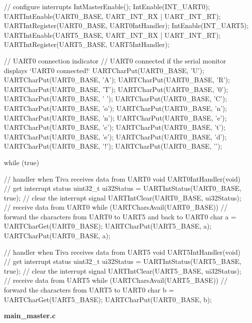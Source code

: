 \documentclass[12pt, a4paper]{article}
\begin{document}
\begin{code}
{    // configure interrupts
    IntMasterEnable();
    IntEnable(INT_UART0);
    UARTIntEnable(UART0_BASE, UART_INT_RX | UART_INT_RT);
    UARTIntRegister(UART0_BASE, UART0IntHandler);
    IntEnable(INT_UART5);
    UARTIntEnable(UART5_BASE, UART_INT_RX | UART_INT_RT);
    UARTIntRegister(UART5_BASE, UART5IntHandler);

    // UART0 connection indicator
    // UART0 connected if the serial monitor displays `UART0 connected!`
    UARTCharPut(UART0_BASE, 'U');
    UARTCharPut(UART0_BASE, 'A');
    UARTCharPut(UART0_BASE, 'R');
    UARTCharPut(UART0_BASE, 'T');
    UARTCharPut(UART0_BASE, '0');
    UARTCharPut(UART0_BASE, ' ');
    UARTCharPut(UART0_BASE, 'C');
    UARTCharPut(UART0_BASE, 'o');
    UARTCharPut(UART0_BASE, 'n');
    UARTCharPut(UART0_BASE, 'n');
    UARTCharPut(UART0_BASE, 'e');
    UARTCharPut(UART0_BASE, 'c');
    UARTCharPut(UART0_BASE, 't');
    UARTCharPut(UART0_BASE, 'e');
    UARTCharPut(UART0_BASE, 'd');
    UARTCharPut(UART0_BASE, '!');
    UARTCharPut(UART0_BASE, '\n');

    while (true) {}
}

// handler when Tiva receives data from UART0
void UART0IntHandler(void)
{
    // get interrupt status
    uint32_t ui32Status = UARTIntStatus(UART0_BASE, true);
    // clear the interrupt signal
    UARTIntClear(UART0_BASE, ui32Status);
    // receive data from UART0
    while (UARTCharsAvail(UART0_BASE))
    {
        // forward the characters from UART0 to UART5 and back to UART0
        char a = UARTCharGet(UART0_BASE);
        UARTCharPut(UART5_BASE, a);
        UARTCharPut(UART0_BASE, a);
    }
}

// handler when Tiva receives data from UART5
void UART5IntHandler(void)
{
    // get interrupt status
    uint32_t ui32Status = UARTIntStatus(UART5_BASE, true);
    // clear the interrupt signal
    UARTIntClear(UART5_BASE, ui32Status);
    // receive data from UART5
    while (UARTCharsAvail(UART5_BASE))
    {
        // forward the characters from UART5 to UART0
        char b = UARTCharGet(UART5_BASE);
        UARTCharPut(UART0_BASE, b);
    }
}
\end{code}
\text{   }
\linebreak
\textbf{main\_master.c}
\end{document}
